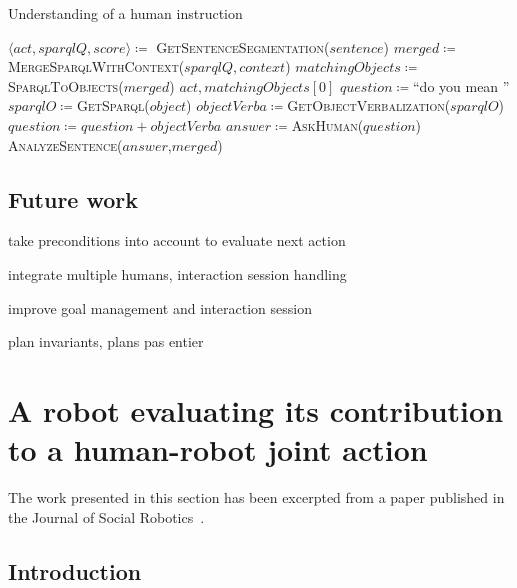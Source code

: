 \documentclass[a4paper,11pt,twoside]{StyleThese}
\begin{document}
\begin{algorithm}[!htb]
	\caption{Understanding of a human instruction}
	\label{chap2:algo:human_instruction}
	\begin{algorithmic}
	\State $\langle act, sparqlQ, score \rangle \coloneqq$ \textsc{GetSentenceSegmentation($sentence$)} 
		\State $merged \coloneqq$\textsc{MergeSparqlWithContext}($sparqlQ,context$)
		\State $matchingObjects \coloneqq$ \textsc{SparqlToObjects}($merged$)
			\State \Return $act,matchingObjects[0]$
		\Else
			\State $question \coloneqq$``do you mean ''
				\State $sparqlO \coloneqq$\textsc{GetSparql($object$)}
				\State $objectVerba \coloneqq$\textsc{GetObjectVerbalization($sparqlO$)}
				\State $question \coloneqq question + objectVerba$
			\EndFor
			\State $answer \coloneqq$\textsc{AskHuman}($question$)
			\State \textsc{AnalyzeSentence}($answer$,$merged$)
		\EndIf
	\EndIf
	\EndFunction
	\end{algorithmic}
\end{algorithm}		


\clearpage
\subsection{Future work}
take preconditions into account to evaluate next action

integrate multiple humans, interaction session handling

improve goal management and interaction session

plan invariants, plans pas entier
 

\section{A robot evaluating its contribution to a human-robot joint action}\label{chap2:sec:qoi}

The work presented in this section has been excerpted from a paper published in the Journal of Social Robotics~\cite{mayima_2021_towards}.

\subsection{Introduction}
\end{document}
